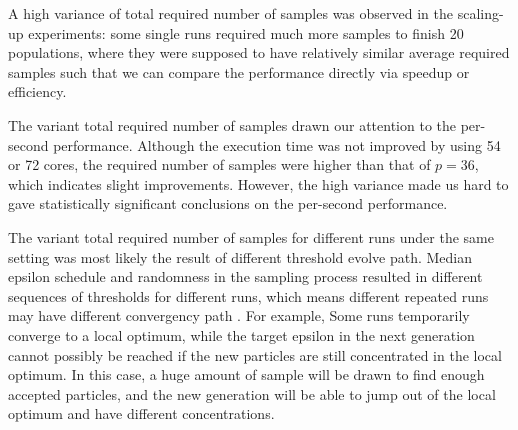 A high variance of total required number of samples was observed in the scaling-up experiments: some single runs required much more samples to finish 20 populations, where they were supposed to have relatively similar average required samples such that we can compare the performance directly via speedup or efficiency. 

The variant total required number of samples drawn our attention to the per-second performance. Although the execution time was not improved by using 54 or 72 cores, the required number of samples were higher than that of $p=36$, which indicates slight improvements. However, the high variance made us hard to gave statistically significant conclusions on the per-second performance.


The variant total required number of samples for different runs under the same setting was most likely the result of different threshold evolve path. Median epsilon schedule and randomness in the sampling process resulted in different sequences of thresholds for different runs, which means different repeated runs may have different convergency path \cite{threshold}. For example, Some runs temporarily converge to a local optimum, while the target epsilon in the next generation cannot possibly be reached if the new particles are still concentrated in the local optimum. In this case, a huge amount of sample will be drawn to find enough accepted particles, and the new generation will be able to jump out of the local optimum and have different concentrations. 

